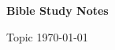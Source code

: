 \documentclass[12pt]{article}
\begin{document}
	\textbf{Bible Study \hfill Notes}

	Topic \hfill \today
	
	\begin{quote}
	\end{quote}
\end{document}

